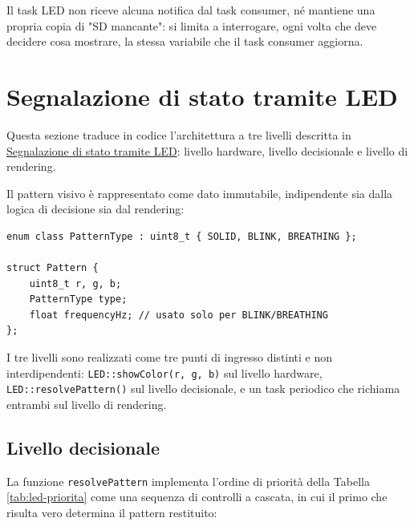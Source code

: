 Il task LED non riceve alcuna notifica dal task consumer, né mantiene una propria
copia di "SD mancante": si limita a interrogare, ogni volta che deve decidere
cosa mostrare, la stessa variabile che il task consumer aggiorna.

\newpage

\section{Segnalazione di stato tramite LED}

Questa sezione traduce in codice l'architettura a tre livelli descritta in
\hyperref[sec:led]{Segnalazione di stato tramite LED}: livello hardware,
livello decisionale e livello di rendering.

Il pattern visivo è rappresentato come dato immutabile, indipendente sia dalla
logica di decisione sia dal rendering:

\begin{listing}[H]
\begin{verbatim}
enum class PatternType : uint8_t { SOLID, BLINK, BREATHING };

struct Pattern {
    uint8_t r, g, b;
    PatternType type;
    float frequencyHz; // usato solo per BLINK/BREATHING
};
\end{verbatim}
\caption{Value Object del pattern visivo}
\label{listing:led-pattern}
\end{listing}

I tre livelli sono realizzati come tre punti di ingresso distinti e non
interdipendenti: \texttt{LED::showColor(r, g, b)} sul livello
hardware, \texttt{LED::resolvePattern()} sul livello decisionale, e
un task periodico che richiama entrambi sul livello di rendering.

\subsection{Livello decisionale}
La funzione \texttt{resolvePattern} implementa l'ordine di priorità della
Tabella \ref{tab:led-priorita} come una sequenza di controlli a cascata, in
cui il primo che risulta vero determina il pattern restituito:

